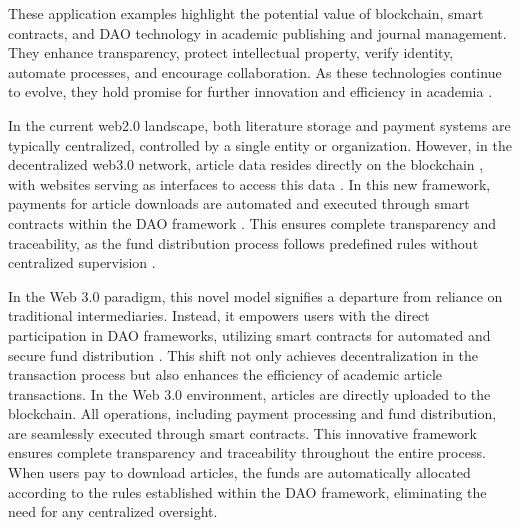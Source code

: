 \documentclass[lettersize,journal]{IEEEtran}
\begin{document}
These application examples highlight the potential value of blockchain, smart contracts, and DAO technology in academic publishing and journal management. They enhance transparency, protect intellectual property, verify identity, automate processes, and encourage collaboration. As these technologies continue to evolve, they hold promise for further innovation and efficiency in academia \cite{vacca2021systematic}.


In the current web2.0 landscape, both literature storage and payment systems are typically centralized, controlled by a single entity or organization. However, in the decentralized web3.0 network, article data resides directly on the blockchain \cite{alabdulwahhab2018web}, with websites serving as interfaces to access this data \cite{10402553} \cite{971982} \cite{6222336}. 
In this new framework, payments for article downloads are automated and executed through smart contracts within the DAO framework \cite{cao2022decentralized}. This ensures complete transparency and traceability, as the fund distribution process follows predefined rules without centralized supervision \cite{10302676}. 


In the Web 3.0 paradigm, this novel model signifies a departure from reliance on traditional intermediaries. Instead, it empowers users with the direct participation in DAO frameworks, utilizing smart contracts for automated and secure fund distribution \cite{10302435}. This shift not only achieves decentralization in the transaction process but also enhances the efficiency of academic article transactions.
In the Web 3.0 environment, articles are directly uploaded to the blockchain. All operations, including payment processing and fund distribution, are seamlessly executed through smart contracts. This innovative framework ensures complete transparency and traceability throughout the entire process. When users pay to download articles, the funds are automatically allocated according to the rules established within the DAO framework, eliminating the need for any centralized oversight.
  
\end{document}
